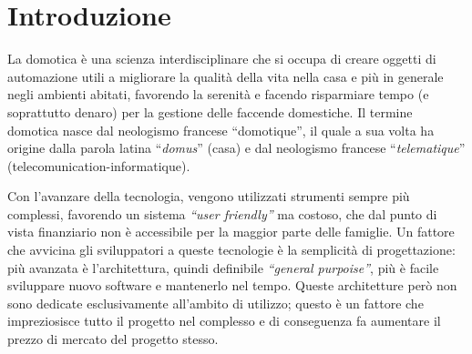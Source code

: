 \documentclass[a4paper,titlepage]{book}
\begin{document}
\begin{frontespizio}
\end{frontespizio}





\chapter*{Introduzione}
La domotica è una scienza interdisciplinare che si occupa di creare oggetti di automazione utili a migliorare la qualità della vita nella casa e più in generale negli ambienti abitati, favorendo la serenità e facendo risparmiare tempo (e soprattutto denaro) per la gestione delle faccende domestiche. Il termine domotica nasce dal neologismo francese ``domotique'', il quale a sua volta ha origine dalla parola latina ``\textit{domus}'' (casa) e dal neologismo francese ``\textit{telematique}'' (telecomunication-informatique). 
 
Con l'avanzare della tecnologia, vengono utilizzati strumenti sempre più complessi, favorendo un sistema \textit{``user friendly''} ma costoso, che dal punto di vista finanziario non è accessibile per la maggior parte delle famiglie. Un fattore che avvicina gli sviluppatori a queste tecnologie è la semplicità di progettazione: più avanzata è l'architettura, quindi definibile \textit{``general purpoise''}, più è facile sviluppare nuovo software e mantenerlo nel tempo. Queste architetture però non sono dedicate esclusivamente all'ambito di utilizzo; questo è un fattore che impreziosisce tutto il progetto nel complesso e di conseguenza fa aumentare il prezzo di mercato del progetto stesso.
\end{document}
